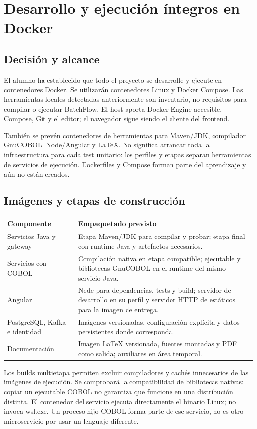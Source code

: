 \chapter{Desarrollo y ejecución íntegros en Docker}
\section{Decisión y alcance}
El alumno ha establecido que todo el proyecto se desarrolle y ejecute en contenedores Docker. Se utilizarán contenedores Linux y Docker Compose. Las herramientas locales detectadas anteriormente son inventario, no requisitos para compilar o ejecutar BatchFlow. El host aporta Docker Engine accesible, Compose, Git y el editor; el navegador sigue siendo el cliente del frontend.

También se prevén contenedores de herramientas para Maven/JDK, compilador GnuCOBOL, Node/Angular y LaTeX. No significa arrancar toda la infraestructura para cada test unitario: los perfiles y etapas separan herramientas de servicios de ejecución. Dockerfiles y Compose forman parte del aprendizaje y aún no están creados.

\section{Imágenes y etapas de construcción}
\begin{longtable}{L{0.30\textwidth}L{0.62\textwidth}}
\textbf{Componente} & \textbf{Empaquetado previsto}\\\hline
Servicios Java y gateway & Etapa Maven/JDK para compilar y probar; etapa final con runtime Java y artefactos necesarios.\\
Servicios con COBOL & Compilación nativa en etapa compatible; ejecutable y bibliotecas GnuCOBOL en el runtime del mismo servicio Java.\\
Angular & Node para dependencias, tests y build; servidor de desarrollo en su perfil y servidor HTTP de estáticos para la imagen de entrega.\\
PostgreSQL, Kafka e identidad & Imágenes versionadas, configuración explícita y datos persistentes donde corresponda.\\
Documentación & Imagen LaTeX versionada, fuentes montadas y PDF como salida; auxiliares en área temporal.\\
\end{longtable}

Los builds multietapa permiten excluir compiladores y cachés innecesarios de las imágenes de ejecución. Se comprobará la compatibilidad de bibliotecas nativas: copiar un ejecutable COBOL no garantiza que funcione en una distribución distinta. El contenedor del servicio ejecuta directamente el binario Linux; no invoca wsl.exe. Un proceso hijo COBOL forma parte de ese servicio, no es otro microservicio por usar un lenguaje diferente.

